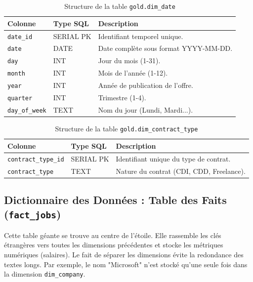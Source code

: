 \documentclass[12pt,a4paper,twoside]{report}
\begin{document}
\begin{table}[H]
    \centering
    \begin{tabularx}{\textwidth}{|l|l|X|}
        \hline
        \textbf{Colonne} & \textbf{Type SQL} & \textbf{Description} \\
        \hline
        \texttt{date\_id} & SERIAL PK & Identifiant temporel unique. \\
        \texttt{date} & DATE & Date complète sous format YYYY-MM-DD. \\
        \texttt{day} & INT & Jour du mois (1-31). \\
        \texttt{month} & INT & Mois de l'année (1-12). \\
        \texttt{year} & INT & Année de publication de l'offre. \\
        \texttt{quarter} & INT & Trimestre (1-4). \\
        \texttt{day\_of\_week}& TEXT & Nom du jour (Lundi, Mardi...). \\
        \hline
    \end{tabularx}
    \caption{Structure de la table \texttt{gold.dim\_date}}
\end{table}

\begin{table}[H]
    \centering
    \begin{tabularx}{\textwidth}{|l|l|X|}
        \hline
        \textbf{Colonne} & \textbf{Type SQL} & \textbf{Description} \\
        \hline
        \texttt{contract\_type\_id} & SERIAL PK & Identifiant unique du type de contrat. \\
        \texttt{contract\_type} & TEXT & Nature du contrat (CDI, CDD, Freelance). \\
        \hline
    \end{tabularx}
    \caption{Structure de la table \texttt{gold.dim\_contract\_type}}
\end{table}

\subsection{Dictionnaire des Données : Table des Faits (\texttt{fact\_jobs})}
Cette table géante se trouve au centre de l'étoile. Elle rassemble les clés étrangères vers toutes les dimensions précédentes et stocke les métriques numériques (salaires). Le fait de séparer les dimensions évite la redondance des textes longs. Par exemple, le nom "Microsoft" n'est stocké qu'une seule fois dans la dimension \texttt{dim\_company}.
\end{document}
